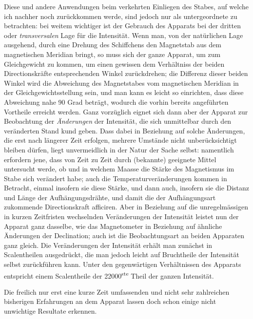 Diese und andere Anwendungen beim verkehrten Einliegen des Stabes, auf
welche ich nachher noch zurückkommen werde, sind jedoch nur als untergeordnete zu betrachten: bei weitem wichtiger ist der Gebrauch des Apparats bei der dritten oder \textit{transversalen} Lage für die Intensität. Wenn man, von der natürlichen Lage ausgehend, durch eine Drehung des Schiffchens den Magnetstab aus dem magnetischen Meridian bringt, so muss sich der ganze Apparat, um zum Gleichgewicht zu kommen, um einen gewissen dem Verhältniss der beiden Directionskräfte entsprechenden Winkel zurückdrehen; die Differenz dieser beiden Winkel wird die Abweichung des Magnetstabes vom magnetischen Meridian in der Gleichgewichtsstellung sein, und man kann es leicht so einrichten, dass diese Abweichung nahe 90 Grad beträgt, wodurch die vorhin bereits angeführten Vortheile erreicht werden. Ganz vorzüglich eignet sich dann aber der Apparat zur Beobachtung der \textit{Änderungen} der Intensität, die sich unmittelbar durch den veränderten Stand kund geben. Dass dabei in Beziehung auf solche Änderungen, die erst nach längerer Zeit erfolgen, mehrere Umstände nicht unberücksichtigt bleiben dürfen, liegt unvermeidlich in der Natur der Sache selbst: namentlich erfordern jene, dass von Zeit zu Zeit durch (bekannte) geeignete Mittel untersucht werde, ob und in welchem Maasse die Stärke des Magnetismus im Stabe sich verändert habe; auch die Temperaturveränderungen kommen in Betracht, einmal insofern sie diese Stärke, und dann auch, insofern sie die Distanz und Länge der Aufhängungsdrähte, und damit die der Aufhängungsart zukommende Directionskraft afficiren. Aber in Beziehung auf die unregelmässigen in kurzen Zeitfristen wechselnden Veränderungen der Intensität leistet nun der Apparat ganz dasselbe, wie das Magnetometer in Beziehung auf ähnliche Änderungen der Declination; auch ist die Beobachtungsart an beiden Apparaten ganz gleich. Die Veränderungen der Intensität erhält man zunächst in Scalentheilen ausgedrückt, die man jedoch leicht auf Bruchtheile der Intensität selbst zurückführen kann. Unter den gegenwärtigen Verhältnissen des Apparats entspricht einem Scalentheile der 22000\textsuperscript{ste} Theil der ganzen Intensität.

Die freilich nur erst eine kurze Zeit umfassenden und nicht sehr zahlreichen bisherigen Erfahrungen an dem Apparat lassen doch schon einige nicht unwichtige Resultate erkennen.

